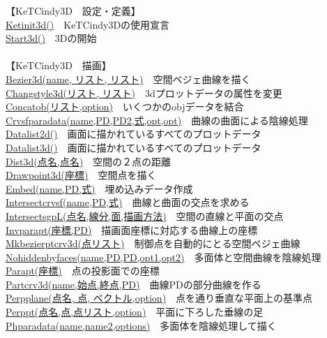 \documentclass[papersize,a4paper,12pt,uplatex]{jsarticle}
\begin{document}
\begin{tabbing}
【KeTCindy3D　設定・定義】\\
\hyperlink{ketinit3d}{Ketinit3d()}　\>KeTCindy3Dの使用宣言\\
\hyperlink{start3d}{Start3d()}　\>3Dの開始\\
　\\
【KeTCindy3D　描画】\\
\hyperlink{bezier3d}{Bezier3d(name, リスト, リスト)}　\>空間ベジェ曲線を描く\\
\hyperlink{changstyle3d}{Changstyle3d(リスト, リスト)}　\>3dプロットデータの属性を変更\\
\hyperlink{concatobj}{Concatob(リスト,option)}　\>いくつかのobjデータを結合\\
\hyperlink{crvsfparadata}{Crvsfparadata(name,PD,PD2,式,opt,opt)}　\>曲線の曲面による陰線処理\\
\hyperlink{datalist}{Datalist2d()}　\>画面に描かれているすべてのプロットデータ\\
\hyperlink{datalist}{Datalist3d()}　\>画面に描かれているすべてのプロットデータ\\
\hyperlink{dist3d}{Dist3d(点名,点名)}　\>空間の２点の距離\\
\hyperlink{drawpoint3d}{Drawpoint3d(座標)}　\>空間点を描く\\
\hyperlink{embed}{Embed(name,PD,式)}　\>埋め込みデータ作成\\
\hyperlink{intersectcrvsf}{Intersectcrvsf(name,PD,式)}　\>曲線と曲面の交点を求める\\
\hyperlink{intersectsgpL}{IntersectsgpL(点名,線分,面,描画方法)}　\>空間の直線と平面の交点\\
\hyperlink{invparapt}{Invparapt(座標,PD)}　\>描画面座標に対応する曲線上の座標\\
\hyperlink{mkbezierptcrv3d}{Mkbezierptcrv3d(点リスト)}　\>制御点を自動的にとる空間ベジェ曲線\\
\hyperlink{nohiddenbyfaces}{Nohiddenbyfaces(name,PD,PD,opt1,opt2)}　\>多面体と空間曲線を陰線処理\\
\hyperlink{parapt}{Parapt(座標)}　\>点の投影面での座標\\
\hyperlink{partcrv3d}{Partcrv3d(name,始点,終点,PD)}　\>曲線PDの部分曲線を作る\\
\hyperlink{perpplane}{Perpplane(点名, 点, ベクトル,option)}　\>点を通り垂直な平面上の基準点\\
\hyperlink{perppt}{Perppt(点名,点,点リスト,option)}　\>平面に下ろした垂線の足\\
\hyperlink{phparadata}{Phparadata(name,name2,options)}　\>多面体を陰線処理して描く\\

\end{tabbing}
\end{document}
